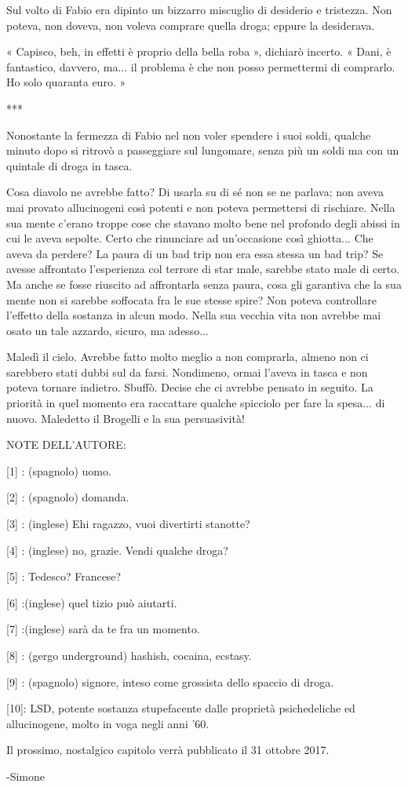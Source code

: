 Sul volto di Fabio era dipinto un bizzarro miscuglio di desiderio e tristezza. Non poteva, non doveva, non voleva comprare quella droga; eppure la desiderava.

« Capisco, beh, in effetti è proprio della bella roba », dichiarò incerto. « Dani, è fantastico, davvero, ma... il problema è che non posso permettermi di comprarlo. Ho solo quaranta euro. »

***

Nonostante la fermezza di Fabio nel non voler spendere i suoi soldi, qualche minuto dopo si ritrovò a passeggiare sul lungomare, senza più un soldi ma con un quintale di droga in tasca.

Cosa diavolo ne avrebbe fatto? Di usarla su di sé non se ne parlava; non aveva mai provato allucinogeni così potenti e non poteva permettersi di rischiare. Nella sua mente c'erano troppe cose che stavano molto bene nel profondo degli abissi in cui le aveva sepolte. Certo che rinunciare ad un'occasione così ghiotta... Che aveva da perdere? La paura di un bad trip non era essa stessa un bad trip? Se avesse affrontato l'esperienza col terrore di star male, sarebbe stato male di certo. Ma anche se fosse riuscito ad affrontarla senza paura, cosa gli garantiva che la sua mente non si sarebbe soffocata fra le sue stesse spire? Non poteva controllare l'effetto della sostanza in alcun modo. Nella sua vecchia vita non avrebbe mai osato un tale azzardo, sicuro, ma adesso...

Maledì il cielo. Avrebbe fatto molto meglio a non comprarla, almeno non ci sarebbero stati dubbi sul da farsi. Nondimeno, ormai l'aveva in tasca e non poteva tornare indietro. Sbuffò. Decise che ci avrebbe pensato in seguito. La priorità in quel momento era raccattare qualche spicciolo per fare la spesa... di nuovo. Maledetto il Brogelli e la sua persuasività!


NOTE DELL'AUTORE:

[1] : (spagnolo) uomo.

[2] : (spagnolo) domanda.

[3] : (inglese) Ehi ragazzo, vuoi divertirti stanotte?

[4] : (inglese) no, grazie. Vendi qualche droga?

[5] : Tedesco? Francese?

[6] :(inglese) quel tizio può aiutarti.

[7] :(inglese) sarà da te fra un momento.

[8] : (gergo underground) hashish, cocaina, ecstasy. 

[9] : (spagnolo) signore, inteso come grossista dello spaccio di droga.

[10]: LSD, potente sostanza stupefacente dalle proprietà psichedeliche ed allucinogene, molto in voga negli anni '60.


Il prossimo, nostalgico capitolo verrà pubblicato il 31 ottobre 2017.

-Simone



